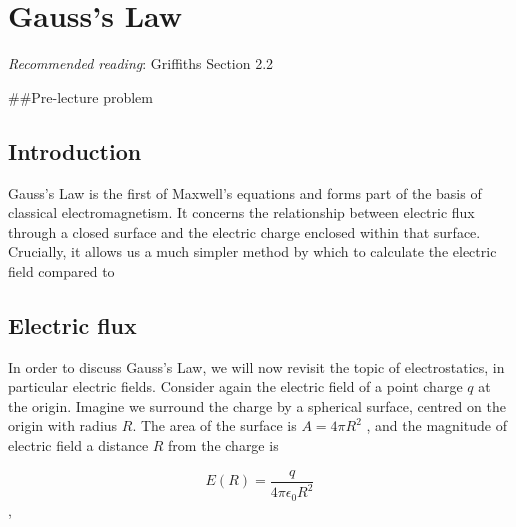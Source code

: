 \documentclass[
  letterpaper,
  DIV=11,
  numbers=noendperiod]{scrreprt}
\begin{document}

\chapter{Gauss's Law}\label{gausss-law}

\newcommand{\l}{\mathrm{\mathbf{l}}}
\newcommand{\E}{\mathrm{\mathbf{E}}}
\newcommand{\F}{\mathrm{\mathbf{F}}}
\newcommand{\r}{\mathrm{\mathbf{r}}}
\newcommand{\B}{\mathrm{\mathbf{B}}}
\newcommand{\A}{\mathrm{\mathbf{A}}}
\newcommand{\x}{\mathrm{\mathbf{x}}}
\newcommand{\y}{\mathrm{\mathbf{y}}}
\newcommand{\z}{\mathrm{\mathbf{z}}}
\newcommand{\v}{\mathrm{\mathbf{v}}}
\newcommand{\p}{\mathrm{\mathbf{p}}}
\newcommand{\d}{\mathrm{\mathbf{d}}}

\newcommand{\a}{\mathrm{\mathbf{a}}}
\newcommand{\b}{\mathrm{\mathbf{b}}}
\newcommand{\I}{\mathrm{\mathbf{I}}}
\newcommand{\K}{\mathrm{\mathbf{K}}}
\newcommand{\J}{\mathrm{\mathbf{J}}}
\newcommand{\A}{\mathrm{\mathbf{A}}}
\newcommand{\dd}{\mathrm{d}}

\emph{Recommended reading}: Griffiths Section 2.2

\#\#Pre-lecture problem

\section{Introduction}\label{introduction}

Gauss's Law is the first of Maxwell's equations and forms part of the
basis of classical electromagnetism. It concerns the relationship
between electric flux through a closed surface and the electric charge
enclosed within that surface. Crucially, it allows us a much simpler
method by which to calculate the electric field compared to

\section{Electric flux}\label{electric-flux}

In order to discuss Gauss's Law, we will now revisit the topic of
electrostatics, in particular electric fields. Consider again the
electric field of a point charge \(q\) at the origin. Imagine we
surround the charge by a spherical surface, centred on the origin with
radius \(R\). The area of the surface is \(A = 4\pi R^2\) , and the
magnitude of electric field a distance \(R\) from the charge is

\[ E(R) = \frac{q}{4\pi \epsilon_0 R^2} \],
\end{document}
